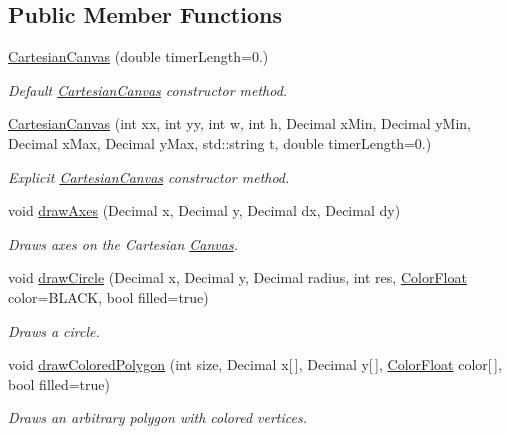 \subsection*{Public Member Functions}
\begin{DoxyCompactItemize}
\item 
\hyperlink{classtsgl_1_1_cartesian_canvas_a4438f368eae3def6a70e0faa15d28daa}{Cartesian\+Canvas} (double timer\+Length=0.)
\begin{DoxyCompactList}\small\item\em Default \hyperlink{classtsgl_1_1_cartesian_canvas}{Cartesian\+Canvas} constructor method. \end{DoxyCompactList}\item 
\hyperlink{classtsgl_1_1_cartesian_canvas_afc558daec281bc165d1a313d94a56ea0}{Cartesian\+Canvas} (int xx, int yy, int w, int h, Decimal x\+Min, Decimal y\+Min, Decimal x\+Max, Decimal y\+Max, std\+::string t, double timer\+Length=0.)
\begin{DoxyCompactList}\small\item\em Explicit \hyperlink{classtsgl_1_1_cartesian_canvas}{Cartesian\+Canvas} constructor method. \end{DoxyCompactList}\item 
void \hyperlink{classtsgl_1_1_cartesian_canvas_a2df0f8c5ca08617a0528d1aee4e788a8}{draw\+Axes} (Decimal x, Decimal y, Decimal dx, Decimal dy)
\begin{DoxyCompactList}\small\item\em Draws axes on the Cartesian \hyperlink{classtsgl_1_1_canvas}{Canvas}. \end{DoxyCompactList}\item 
void \hyperlink{classtsgl_1_1_cartesian_canvas_a3eded860de450d1b1e46b18391ef8299}{draw\+Circle} (Decimal x, Decimal y, Decimal radius, int res, \hyperlink{structtsgl_1_1_color_float}{Color\+Float} color=B\+L\+A\+C\+K, bool filled=true)
\begin{DoxyCompactList}\small\item\em Draws a circle. \end{DoxyCompactList}\item 
void \hyperlink{classtsgl_1_1_cartesian_canvas_ab6c30ca151e3e38b50d6b2eb7bf1ed78}{draw\+Colored\+Polygon} (int size, Decimal x\mbox{[}$\,$\mbox{]}, Decimal y\mbox{[}$\,$\mbox{]}, \hyperlink{structtsgl_1_1_color_float}{Color\+Float} color\mbox{[}$\,$\mbox{]}, bool filled=true)
\begin{DoxyCompactList}\small\item\em Draws an arbitrary polygon with colored vertices. \end{DoxyCompactList}\item 

\end{DoxyCompactItemize}
